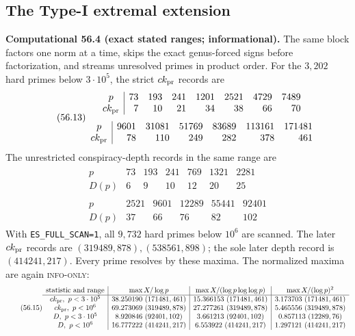 \documentclass[10pt,reqno]{amsart}
\theoremstyle{definition}
\newcommand{\1}{\mathbf 1}
\begin{document}
\subsection{The Type-I extremal extension}
\medskip\noindent\textbf{Computational 56.4 (exact stated ranges;
informational).}
The same block factors one norm at a time, skips the exact genus-forced signs
before factorization, and streams unresolved primes in product order.  For
the $3{,}202$ hard primes below $3\cdot10^5$, the strict $ck_{\rm pr}$
records are
\begin{equation}\tag{56.13}
\begin{gathered}
\begin{array}{c|rrrrrrr}
p&73&193&241&1201&2521&4729&7489\\
ck_{\rm pr}&7&10&21&34&38&66&70
\end{array}\\[3pt]
\begin{array}{c|rrrrrr}
p&9601&31081&51769&83689&113161&171481\\
ck_{\rm pr}&78&110&249&282&378&461
\end{array}
\end{gathered}
\end{equation}
The unrestricted conspiracy-depth records in the same range are
\begin{equation}\tag{56.14}
\begin{gathered}
\begin{array}{c|rrrrrr}
p&73&193&241&769&1321&2281\\
D(p)&6&9&10&12&20&25
\end{array}\\[3pt]
\begin{array}{c|rrrrr}
p&2521&9601&12289&55441&92401\\
D(p)&37&66&76&82&102
\end{array}
\end{gathered}
\end{equation}
With \texttt{ES\_FULL\_SCAN=1}, all $9{,}732$ hard primes below $10^6$ are
scanned.  The later $ck_{\rm pr}$ records are
$(319489,878),(538561,898)$; the sole later depth record is
$(414241,217)$.  Every prime resolves by these maxima.  The normalized
maxima are again \textsc{info-only}:
\begingroup
\scriptsize
\setlength{\arraycolsep}{3pt}
\begin{equation}\tag{56.15}
\begin{array}{c|c|c|c}
\text{statistic and range}&\max X/\log p&
 \max X/(\log p\log\log p)&\max X/(\log p)^2\\ \hline
ck_{\rm pr},\ p<3\cdot10^5&38.250190\ (171481,461)&
 15.366153\ (171481,461)&3.173703\ (171481,461)\\
ck_{\rm pr},\ p<10^6&69.273069\ (319489,878)&
 27.277261\ (319489,878)&5.465556\ (319489,878)\\
D,\ p<3\cdot10^5&8.920846\ (92401,102)&
 3.661213\ (92401,102)&0.857113\ (12289,76)\\
D,\ p<10^6&16.777222\ (414241,217)&
 6.553922\ (414241,217)&1.297121\ (414241,217)
\end{array}
\end{equation}
\end{document}
